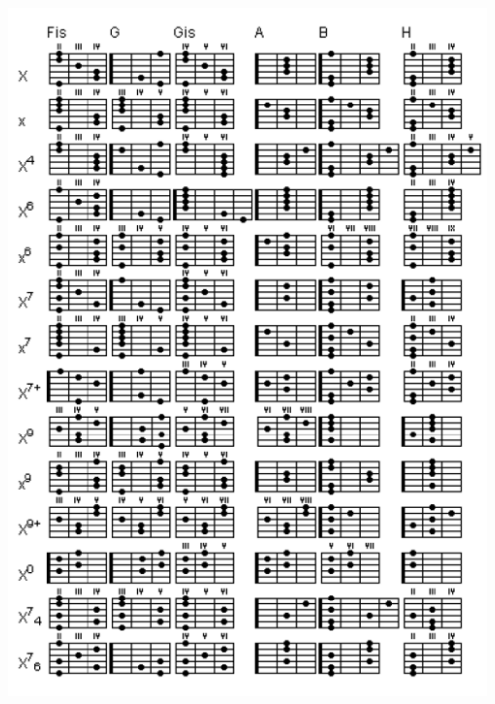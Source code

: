 \documentclass[a5paper, 10pt]{book}
\begin{document}
\includegraphics[width=0.95\textwidth, center]{chordchart2.png}\\
\end{document}
